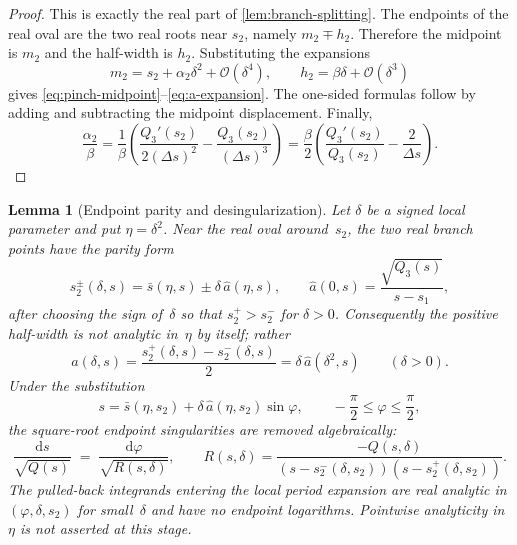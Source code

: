 \documentclass[11pt,a4paper]{article}
\theoremstyle{plain}
\newtheorem{lemma}[theorem]{Lemma}
\theoremstyle{definition}
\theoremstyle{remark}
\newcommand{\dd}{\mathrm{d}}
\newcommand{\Oo}{\mathcal{O}}
\begin{document}
\begin{proof}
  This is exactly the real part of \cref{lem:branch-splitting}.
  The endpoints of the real oval are the two real roots near $s_2$,
  namely $m_2\mp h_2$.  Therefore the midpoint is $m_2$ and the
  half-width is $h_2$.  Substituting the expansions
  \[
    m_2=s_2+\alpha_2\delta^2+\Oo(\delta^4),
    \qquad
    h_2=\beta\delta+\Oo(\delta^3)
  \]
  gives \eqref{eq:pinch-midpoint}--\eqref{eq:a-expansion}.  The
  one-sided formulas follow by adding and subtracting the midpoint
  displacement.  Finally,
  \[
    \frac{\alpha_2}{\beta}
    =
    \frac{1}{\beta}
    \left(
      \frac{Q_3'(s_2)}{2(\Delta s)^2}
      -
      \frac{Q_3(s_2)}{(\Delta s)^3}
    \right)
    =
    \frac{\beta}{2}
    \left(\frac{Q_3'(s_2)}{Q_3(s_2)}-\frac{2}{\Delta s}\right).
  \]
\end{proof}

\begin{lemma}[Endpoint parity and desingularization]%
\label{lem:smooth}
  Let $\delta$ be a signed local parameter and put $\eta=\delta^2$.
  Near the real oval around~$s_2$, the two real branch points have
  the parity form
  \[
    s_2^\pm(\delta,s)
    =
    \bar s(\eta,s)\pm\delta\,\widehat a(\eta,s),
    \qquad
    \widehat a(0,s)=\frac{\sqrt{Q_3(s)}}{s-s_1},
  \]
  after choosing the sign of~$\delta$ so that
  $s_2^+>s_2^-$ for $\delta>0$.  Consequently the positive
  half-width is not analytic in~$\eta$ by itself; rather
  \[
    a(\delta,s)=\frac{s_2^+(\delta,s)-s_2^-(\delta,s)}{2}
    =\delta\,\widehat a(\delta^2,s)
    \qquad(\delta>0).
  \]
  Under the substitution
  \[
    s=\bar s(\eta,s_2)+\delta\,\widehat a(\eta,s_2)\sin\varphi,
    \qquad -\frac{\pi}{2}\le\varphi\le\frac{\pi}{2},
  \]
  the square-root endpoint singularities are removed algebraically:
  \begin{equation}\label{eq:desing-factorisation}
    \frac{\dd s}{\sqrt{Q(s)}}
    \;=\;
    \frac{\dd\varphi}{\sqrt{R(s,\delta)}},
    \qquad
    R(s,\delta)
    =
    \frac{-Q(s,\delta)}
         {(s-s_2^-(\delta,s_2))(s-s_2^+(\delta,s_2))}.
  \end{equation}
  The pulled-back integrands entering the local period expansion are
  real analytic in $(\varphi,\delta,s_2)$ for small~$\delta$ and have
  no endpoint logarithms.  Pointwise analyticity in~$\eta$ is not
  asserted at this stage.
\end{lemma}
\end{document}

